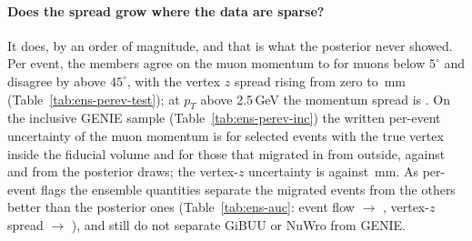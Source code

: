 \documentclass[11pt]{article}
\begin{document}
\paragraph{Does the spread grow where the data are sparse?} It does, by an order of magnitude, and that is what the
posterior never showed. Per event, the members agree on the muon momentum to \nEnsPerEvPbulk{} for muons below
$5^\circ$ and disagree by \nEnsPerEvPwide{} above $45^\circ$, with the vertex $z$ spread rising from zero to
\nEnsPerEvZwide{}\,mm (Table~\ref{tab:ens-perev-test}); at $p_T$ above 2.5\,GeV the momentum spread is
\nEnsPerEvPhighpT{}. On the inclusive GENIE sample (Table~\ref{tab:ens-perev-inc}) the written per-event
uncertainty of the muon momentum is \nEnsIncPinside{} for selected events with the true vertex inside the fiducial
volume and \nEnsIncPoutside{} for those that migrated in from outside, against \nEnsIncPostPinside{} and
\nEnsIncPostPoutside{} from the posterior draws; the vertex-$z$ uncertainty is \nEnsIncZinside{} against
\nEnsIncZoutside{}\,mm. As per-event flags the ensemble quantities separate the migrated events from the others
better than the posterior ones (Table~\ref{tab:ens-auc}: event flow \nEnsAUCflowPost{} $\to$ \nEnsAUCflowEns{},
vertex-$z$ spread \nEnsAUCvzPost{} $\to$ \nEnsAUCvzEns{}), and still do not separate GiBUU or NuWro from GENIE.

\begin{table}[h]\centering\footnotesize

\caption{Per-event between-member spread (median over events reconstructed by every member) of the muon momentum
and the recoil energy, relative, and of the vertex $z$, in bins of the true muon $p_T$ and angle; CC $\nu_\mu$ test
events.}
\label{tab:ens-perev-test}
\end{table}

\begin{table}[h]\centering\footnotesize
\resizebox{\textwidth}{!}{}
\caption{Per-event uncertainties written to the inclusive GENIE file (medians): the posterior-draw columns of the
single model against the between-member columns of the ensemble, for reconstructed-fiducial events by origin,
muon angle and $p_T$.}
\label{tab:ens-perev-inc}
\end{table}

\begin{table}[h]\centering\footnotesize

\caption{AUC of the per-event epistemic quantities as flags, posterior draws against the ensemble: true vertex
outside against inside the fiducial volume among reconstructed-fiducial GENIE events, and GiBUU against GENIE among
the events from outside.}
\label{tab:ens-auc}
\end{table}
\end{document}
